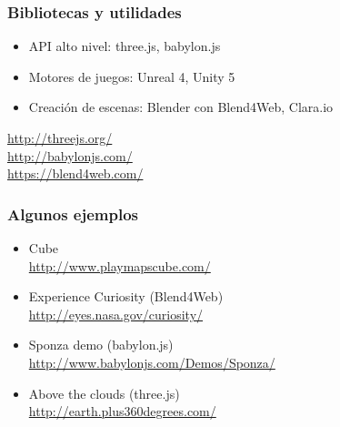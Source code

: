 \begin{frame}
\frametitle{Bibliotecas y utilidades}

{\Large
\begin{itemize}
\item API alto nivel: three.js, babylon.js
\item Motores de juegos: Unreal 4, Unity 5
\item Creación de escenas: Blender con Blend4Web, Clara.io
\end{itemize}
}
\vspace{1cm}
\begin{flushright}
  \url{http://threejs.org/} \\
  \url{http://babylonjs.com/} \\
  \url{https://blend4web.com/} \\
\end{flushright}
\end{frame}

\begin{frame}
\frametitle{Algunos ejemplos}

{\Large
  \begin{itemize}
    \item Cube \\
    \url{http://www.playmapscube.com/} \\
  \item Experience Curiosity (Blend4Web)\\
    \url{http://eyes.nasa.gov/curiosity/} \\
  \item Sponza demo (babylon.js) \\
    \url{http://www.babylonjs.com/Demos/Sponza/} \\
  \item Above the clouds (three.js) \\
    \url{http://earth.plus360degrees.com/} \\
  \end{itemize}
}

\end{frame}


